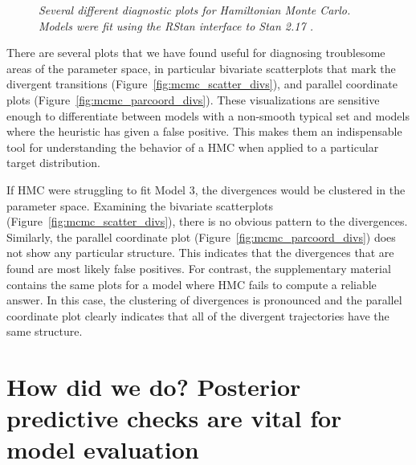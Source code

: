 \documentclass{statsoc}
\begin{document}
\begin{figure}
\caption{\it Several different diagnostic plots for Hamiltonian Monte Carlo.
Models were fit using the RStan interface to Stan 2.17 \citep{rstan}.}
\end{figure} 

There are several plots that we have found useful for diagnosing troublesome
areas of the parameter space, in particular bivariate scatterplots that mark the
divergent transitions (Figure~\ref{fig:mcmc_scatter_divs}), and parallel
coordinate plots (Figure~\ref{fig:mcmc_parcoord_divs}). These visualizations are
sensitive enough to differentiate between models with a non-smooth typical set
and models where the heuristic has given a false positive. This makes them an
indispensable tool for understanding the behavior of a HMC when applied to a
particular target distribution.

If HMC were struggling to fit Model 3, the divergences would be clustered in the
parameter space. Examining the bivariate scatterplots
(Figure~\ref{fig:mcmc_scatter_divs}), there is no obvious pattern to the
divergences. Similarly, the parallel coordinate plot
(Figure~\ref{fig:mcmc_parcoord_divs}) does not show any particular structure.
This indicates that the divergences that are found are most likely false
positives.  For contrast, the supplementary material contains the same plots for
a model where HMC fails to compute a reliable answer. In this case, the
clustering of divergences is pronounced and the parallel coordinate plot clearly
indicates that all of the divergent trajectories have the same structure.



\section{How did we do? Posterior predictive checks are vital for model evaluation}
\label{sec:ppc}
\end{document}
